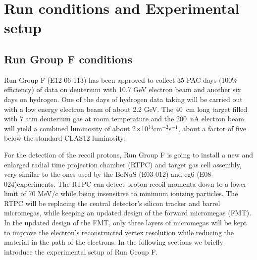 \chapter{Run conditions and Experimental setup}
\label{chap:physics}

\section{Run Group F conditions}

Run Group F (E12-06-113) has been approved to collect 35 PAC days (100\% 
efficiency) of data on deuterium with 10.7 GeV electron beam and another six 
days on hydrogen. One of the days of hydrogen data taking will be carried out 
with a low energy electron beam of about 2.2 GeV. The 40~cm long target filled 
with 7 atm deuterium gas at room temperature and the 200~nA electron beam will 
yield a combined luminosity of about 2$\times$10$^{34}$cm$^{-2}$s$^{-1}$, about 
a factor of five below the standard CLAS12 luminosity.

For the detection of the recoil protons, Run Group F is going to install a new 
and enlarged radial time projection chamber (RTPC) and target gas cell 
assembly, very similar to the ones used by the BoNuS (E03-012) and eg6 
(E08-024)experiments. The RTPC can detect proton recoil momenta down to a lower 
limit of 70 MeV/c while being insensitive to minimum ionizing particles. The 
RTPC will be replacing the central detector's silicon tracker
and barrel micromegas, while keeping an updated design of the forward 
micromegas (FMT). In the updated design of the FMT, only three layers of 
micromegas will be kept to improve the electron's reconstructed vertex 
resolution while reducing the material in the path of the electrons. In the 
following sections we briefly introduce the experimental setup of Run Group F. 


